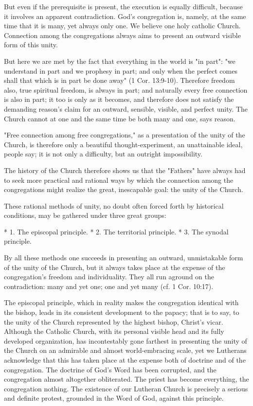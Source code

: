 But even if the prerequisite is present, the execution is equally difficult, because it involves an apparent contradiction. God’s congregation is, namely, at the same time that it is many, yet always only one. We believe one holy catholic Church. Connection among the congregations always aims to present an outward visible form of this unity.

But here we are met by the fact that everything in the world is "in part": "we understand in part and we prophesy in part; and only when the perfect comes shall that which is in part be done away" (1 Cor. 13:9-10). Therefore freedom also, true spiritual freedom, is always in part; and naturally every free connection is also in part; it too is only as it becomes, and therefore does not satisfy the demanding reason’s claim for an outward, sensible, visible, and perfect unity. The Church cannot at one and the same time be both many and one, says reason.

"Free connection among free congregations," as a presentation of the unity of the Church, is therefore only a beautiful thought-experiment, an unattainable ideal, people say; it is not only a difficulty, but an outright impossibility.

The history of the Church therefore shows us that the "Fathers" have always had to seek more practical and rational ways by which the connection among the congregations might realize the great, inescapable goal: the unity of the Church.

These rational methods of unity, no doubt often forced forth by historical conditions, may be gathered under three great groups:

* 1. The episcopal principle.
* 2. The territorial principle.
* 3. The synodal principle.

By all these methods one succeeds in presenting an outward, unmistakable form of the unity of the Church, but it always takes place at the expense of the congregation’s freedom and individuality. They all run aground on the contradiction: many and yet one; one and yet many (cf. 1 Cor. 10:17).

The episcopal principle, which in reality makes the congregation identical with the bishop, leads in its consistent development to the papacy; that is to say, to the unity of the Church represented by the highest bishop, Christ’s vicar. Although the Catholic Church, with its personal visible head and its fully developed organization, has incontestably gone farthest in presenting the unity of the Church on an admirable and almost world-embracing scale, yet we Lutherans acknowledge that this has taken place at the expense both of doctrine and of the congregation. The doctrine of God’s Word has been corrupted, and the congregation almost altogether obliterated. The priest has become everything, the congregation nothing. The existence of our Lutheran Church is precisely a serious and definite protest, grounded in the Word of God, against this principle.

